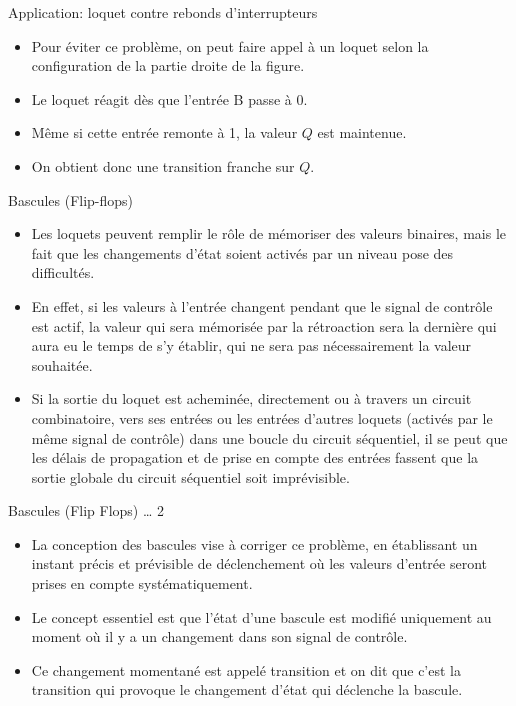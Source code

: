 \documentclass[presentation]{beamer}
\begin{document}
\begin{frame}[label={sec:org0a04aa1}]{Application: loquet contre rebonds d'interrupteurs}
\begin{itemize}
\item Pour éviter ce problème, on peut faire appel à un loquet selon la configuration de la partie droite de la figure.

\item Le loquet réagit dès que l'entrée B passe à 0.

\item Même si cette entrée remonte à 1, la valeur \(Q\) est maintenue.

\item On obtient donc une transition franche sur \(Q\).
\end{itemize}
\end{frame}

\begin{frame}[label={sec:org8ac7191}]{Bascules (Flip-flops)}
\begin{itemize}
\item Les loquets peuvent remplir le rôle de mémoriser des valeurs binaires, mais le fait que les changements d'état soient activés par un \alert{niveau} pose des difficultés.

\item En effet, si les valeurs à l'entrée changent pendant que le signal de contrôle est actif, la valeur qui sera mémorisée par la rétroaction sera la dernière qui aura eu le temps de s'y établir, qui ne sera pas nécessairement la valeur souhaitée.

\item Si la sortie du loquet est acheminée, directement ou à travers un circuit combinatoire, vers ses entrées ou les entrées d'autres loquets (activés par le même signal de contrôle) dans une boucle du circuit séquentiel, il se peut que les délais de propagation et de prise en compte des entrées fassent que la sortie globale du circuit séquentiel soit imprévisible.
\end{itemize}
\end{frame}

\begin{frame}[label={sec:org4a125be}]{Bascules (Flip Flops) \ldots{} 2}
\begin{itemize}
\item La conception des bascules vise à corriger ce problème, en établissant un instant précis et prévisible de déclenchement où les valeurs d'entrée seront prises en compte systématiquement.

\item Le concept essentiel est que l'état d'une bascule est modifié uniquement au moment où il y a un changement dans son signal de contrôle.

\item Ce changement momentané est appelé \alert{transition} et on dit que c'est la transition qui provoque le changement d'état qui \alert{déclenche} la bascule.
\end{itemize}
\end{frame}
\end{document}
